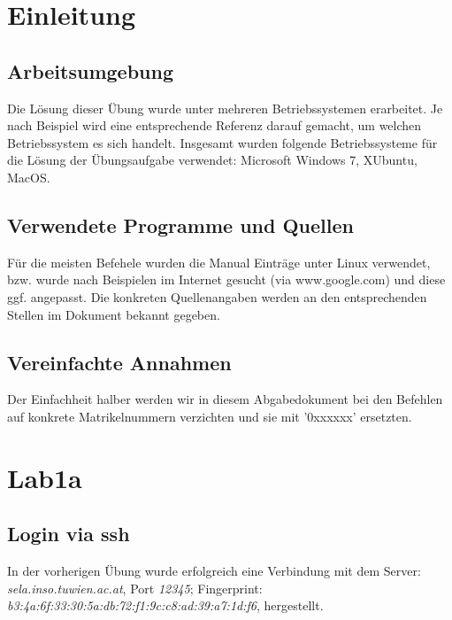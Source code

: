 \documentclass[12pt,a4paper,titlepage,oneside]{scrartcl}
\begin{document}
\maketitle
\setcounter{section}{0}
\setcounter{tocdepth}{2}
\tableofcontents

%
%

\section{Einleitung}

\subsection{Arbeitsumgebung}
Die Lösung dieser Übung wurde unter mehreren Betriebssystemen erarbeitet. Je nach Beispiel wird eine entsprechende Referenz darauf gemacht, um welchen Betriebssystem es sich handelt. Insgesamt wurden folgende Betriebssysteme für die Lösung der Übungsaufgabe verwendet: Microsoft Windows 7, XUbuntu, MacOS.

\subsection{Verwendete Programme und Quellen}
Für die meisten Befehele wurden die Manual Einträge unter Linux verwendet, bzw. wurde nach Beispielen im Internet gesucht (via www.google.com) und diese ggf. angepasst. Die konkreten Quellenangaben werden an den entsprechenden Stellen im Dokument bekannt gegeben.

\subsection{Vereinfachte Annahmen}
Der Einfachheit halber werden wir in diesem Abgabedokument bei den Befehlen auf konkrete Matrikelnummern verzichten und sie mit '0xxxxxx' ersetzten.

\newpage

\section{Lab1a}

\subsection{Login via ssh}
\noindent
In der vorherigen Übung wurde erfolgreich eine Verbindung mit dem Server: \emph{sela.inso.tuwien.ac.at}, Port \emph{12345}; Fingerprint: \emph{b3:4a:6f:33:30:5a:db:72:f1:9c:c8:ad:39:a7:1d:f6}, hergestellt.
\end{document}

